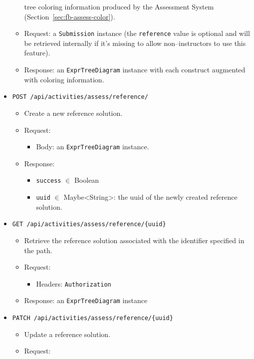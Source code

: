 \begin{chapterBody}
\begin{itemize}
\begin{itemize}
tree coloring information produced by the Assessment System
(Section~\ref{sec:fb-assess-color}).
        \item Request: a \texttt{Submission} instance (the
\texttt{reference} value is optional and will be retrieved internally
if it's missing to allow non–instructors to use this feature).
        \item Response: an \texttt{ExprTreeDiagram} instance with each
construct augmented with coloring information.
    \end{itemize}
    \item \texttt{POST /api/activities/assess/reference/}
    \begin{itemize}
        \item Create a new reference solution.
        \item Request:
        \begin{itemize}
            \item Body: an \texttt{ExprTreeDiagram} instance.
        \end{itemize}
        \item Response:
        \begin{itemize}
            \item \texttt{success} $ \in $ Boolean
            \item \texttt{uuid} $ \in $ Maybe<String>: the uuid of the
newly created reference solution.
        \end{itemize}
    \end{itemize}
    \item \texttt{GET /api/activities/assess/reference/\{uuid\}}
    \begin{itemize}
        \item Retrieve the reference solution associated with the identifier
specified in the path.
        \item Request:
        \begin{itemize}
            \item Headers: \texttt{Authorization}
        \end{itemize}
        \item Response: an \texttt{ExprTreeDiagram} instance
    \end{itemize}
    \item \texttt{PATCH /api/activities/assess/reference/\{uuid\}}
    \begin{itemize}
        \item Update a reference solution.
        \item Request:

\end{itemize}
\end{itemize}
\end{chapterBody}
